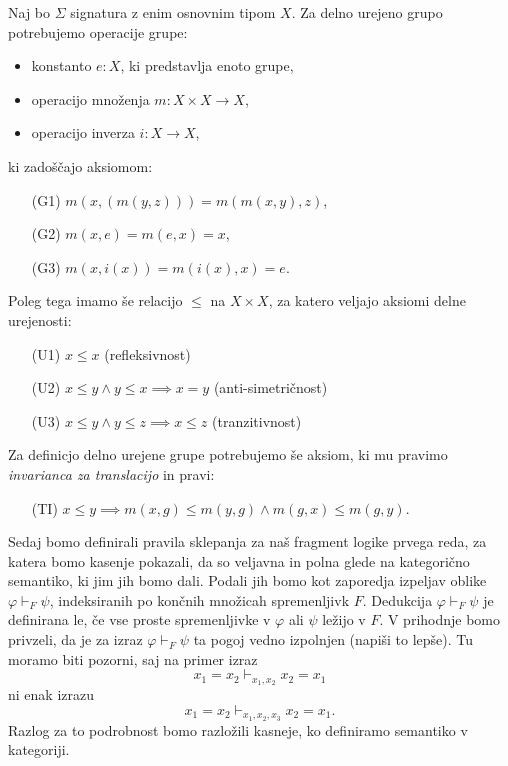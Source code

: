 \documentclass[../kategoricna_logika.tex]{subfiles}
\begin{document}
\begin{primer}\label{primer:delno-urejene-grupe}
  Naj bo $\Sigma$ signatura z enim osnovnim tipom $X$. Za delno
  urejeno grupo potrebujemo operacije grupe:
  \begin{itemize}
  \item konstanto $e : X$, ki predstavlja enoto grupe,
  \item operacijo množenja $m : X \times X \to X$,
  \item operacijo inverza $i : X \to X$,
  \end{itemize}
  ki zadoščajo aksiomom:
  \begin{itemize}
  \item[(G1)] $m(x,(m(y,z))) = m(m(x,y), z)$,
  \item[(G2)] $m(x,e) = m(e,x) = x$,
  \item[(G3)] $m(x,i(x)) = m(i(x), x) = e$.
  \end{itemize}
  Poleg tega imamo še relacijo $\leq$ na $X \times X$, za katero
  veljajo aksiomi delne urejenosti:
  \begin{itemize}
  \item[(U1)] $x \leq x$ (refleksivnost)
  \item[(U2)] $x \leq y \wedge y \leq x \implies x = y$
    (anti-simetričnost)
  \item[(U3)] $x \leq y \wedge y \leq z \implies x \leq z$
    (tranzitivnost)
  \end{itemize}
  Za definicjo delno urejene grupe potrebujemo še aksiom, ki mu pravimo
  {\emph{invarianca za translacijo}} in pravi:
  \begin{itemize}
  \item[(TI)]
    $x \leq y \implies m(x, g) \leq m(y, g) \wedge m(g,x) \leq m(g,y)$.
  \end{itemize}
\end{primer}

Sedaj bomo definirali pravila sklepanja za naš fragment logike prvega
reda, za katera bomo kasenje pokazali, da so veljavna in polna glede
na kategorično semantiko, ki jim jih bomo dali.  Podali jih bomo kot
zaporedja izpeljav oblike $\varphi \vdash_F \psi$, indeksiranih po
končnih množicah spremenljivk $F$. Dedukcija $\varphi \vdash_F \psi$ je
definirana le, če vse proste spremenljivke v $\varphi$ ali $\psi$
ležijo v $F$. V prihodnje bomo privzeli, da je za izraz
$\varphi \vdash_F \psi$ ta pogoj vedno izpolnjen (napiši to lepše).  Tu
moramo biti pozorni, saj na primer izraz
\[x_1 = x_2 \vdash_{x_1, x_2} x_2 = x_1\]
ni enak izrazu
\[x_1 = x_2 \vdash_{x_1, x_2, x_3} x_2 = x_1.\]
Razlog za to podrobnost
bomo razložili kasneje, ko definiramo semantiko v kategoriji.
\end{document}

